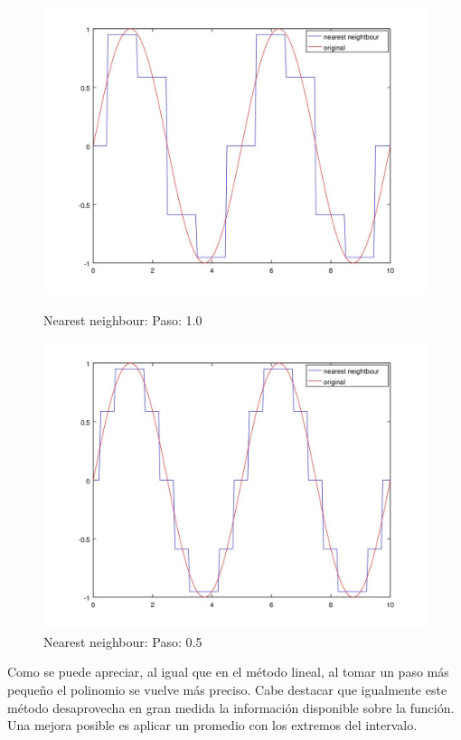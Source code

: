 \begin{figure}[h]
  \begin{minipage}[b]{.5\textwidth}
    \includegraphics[width=\textwidth]{complementos/nearest_1.jpg}
    \caption{Nearest neighbour: Paso: 1.0}
  \end{minipage}
  \begin{minipage}[b]{.5\textwidth}
    \includegraphics[width=\textwidth]{complementos/nearest_05.jpg}
    \caption{Nearest neighbour: Paso: 0.5}
  \end{minipage}
\end{figure}

Como se puede apreciar, al igual que en el método lineal, al tomar un paso más pequeño el polinomio se vuelve más preciso. Cabe destacar que igualmente este método desaprovecha en gran medida la información disponible sobre la función. Una mejora posible es aplicar un promedio con los extremos del intervalo.

